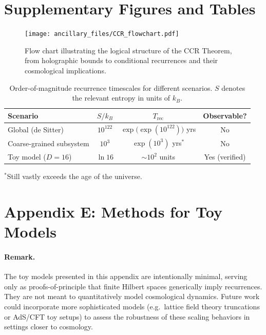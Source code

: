 \documentclass[12pt]{article}
\newcommand{\Trec}{T_{\text{rec}}}
\theoremstyle{remark}
\begin{document}



\nocite{*}

\appendix
\section{Supplementary Figures and Tables}

\begin{figure}[H]
    \centering
\texttt{[image: ancillary\_files/CCR\_flowchart.pdf]}
    \caption{Flow chart illustrating the logical structure of the CCR Theorem, from holographic bounds to conditional recurrences and their cosmological implications.}
    \label{fig:CCR_flowchart}
\end{figure}

\begin{table}[H]
\centering
\caption{Order-of-magnitude recurrence timescales for different scenarios. 
$S$ denotes the relevant entropy in units of $k_B$.}
\vspace{0.2cm}
\begin{tabular}{lccc}
\hline
\textbf{Scenario} & \textbf{$S/k_B$} & \textbf{$\Trec$} & \textbf{Observable?} \\
\hline
Global (de Sitter) & $10^{122}$ & $\exp\!\big(\exp(10^{122})\big)$ yrs & No \\
Coarse-grained subsystem & $10^{3}$ & $\exp(10^{3})$ yrs$^{\ast}$ & No \\
Toy model ($D=16$) & $\ln 16$ & $\sim 10^{2}$ units & Yes (verified) \\
\hline
\end{tabular}
\label{tab:timescales}
\end{table}
\vspace{-0.3cm}
{\footnotesize $^{\ast}$Still vastly exceeds the age of the universe.}

\section*{Appendix E: Methods for Toy Models}
\label{app:methods-toys}

\paragraph{Remark.}
The toy models presented in this appendix are intentionally minimal, serving
only as proofs-of-principle that finite Hilbert spaces generically imply recurrences.
They are not meant to quantitatively model cosmological dynamics. 
Future work could incorporate more sophisticated models (e.g.\ lattice field
theory truncations or AdS/CFT toy setups) to assess the robustness of these
scaling behaviors in settings closer to cosmology.
\end{document}
